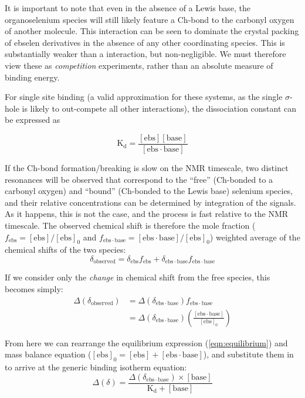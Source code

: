 \begin{refsection}
It is important to note that even in the absence of a Lewis base, the organoselenium species will still likely feature a Ch-bond to the carbonyl oxygen of another molecule.
This interaction can be seen to dominate the crystal packing of ebselen derivatives in the absence of any other coordinating species.
This is substantially weaker than a  interaction, but non-negligible.
We must therefore view these as \emph{competition} experiments, rather than an absolute measure of binding energy.

For single site binding (a valid approximation for these systems, as the single $\sigma$-hole is likely to out-compete all other interactions), the dissociation constant can be expressed as

\begin{equation}
    \label{eqn:equilibrium}
    \mathrm{K_d} = \frac{[\mathrm{ebs}][\mathrm{base}]}{[\mathrm{ebs\cdot base}]}
\end{equation}

If the Ch-bond formation/breaking is slow on the NMR timescale, two distinct resonances will be observed that correspond to the ``free'' (Ch-bonded to a carbonyl oxygen) and ``bound'' (Ch-bonded to the Lewis base) selenium species, and their relative concentrations can be determined by integration of the signals.
As it happens, this is not the case, and the process is fast relative to the NMR timescale.
The observed chemical shift is therefore the mole fraction ($f_\mathrm{ebs} = [\mathrm{ebs}]/[\mathrm{ebs}]_0$ and $f_\mathrm{ebs\cdot base} = [\mathrm{ebs\cdot base}]/[\mathrm{ebs}]_0$) weighted average of the chemical shifts of the two species:
\begin{equation}
    \delta_{\mathrm{observed}} = \delta_{\mathrm{ebs}} f_\mathrm{ebs} + \delta_{\mathrm{ebs\cdot base}} f_{\mathrm{ebs\cdot base}}
\end{equation}

If we consider only the \emph{change} in chemical shift from the free species, this becomes simply:
\begin{align}
    \Delta(\delta_{\mathrm{observed}}) & = \Delta(\delta_{\mathrm{ebs\cdot base}}) f_{\mathrm{ebs\cdot base}} \\
    & = \Delta(\delta_{\mathrm{ebs\cdot base}}) \left(\frac{[\mathrm{ebs\cdot base}]}{[\mathrm{ebs}]_0}\right)
\end{align}

From here we can rearrange the equilibrium expression (\cref{eqn:equilibrium}) and mass balance equation ($[\mathrm{ebs}]_0 = [\mathrm{ebs}] + [\mathrm{ebs\cdot base}]$), and substitute them in to arrive at the generic binding isotherm equation:
\begin{equation}
    \Delta(\delta) = \frac{\Delta(\delta_{\mathrm{ebs\cdot base}})  \times [\mathrm{base}]}{\mathrm{K_{d}} + [\mathrm{base}]}
\end{equation}


\end{refsection}
